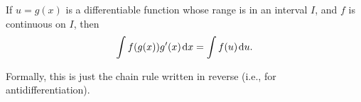 \setcounter{chapter}{5}
\setcounter{section}{5}
\setcounter{theorem}{0}
\setcounter{equation}{0}


%
%

\begin{theorem}
If $u=g(x)$ is a differentiable function whose range is in an interval $I$, and $f$ is continuous on $I$, then
\begin{equation*}
\int f(g(x))g'(x)\mkern 2mu \mathrm{d} x = \int f(u)\mkern 2mu \mathrm{d} u.
\end{equation*}
\end{theorem}

\begin{remark}
Formally, this is just the chain rule written in reverse (i.e., for antidifferentiation).
\end{remark}

